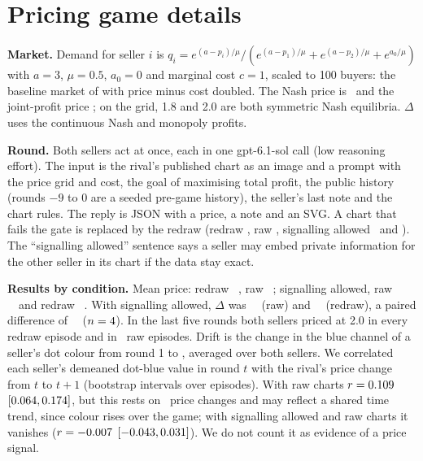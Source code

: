 \documentclass[11pt,letterpaper]{article}
\newcommand{\lead}[1]{\par\addvspace{4pt}\noindent\textbf{#1}}
\begin{document}
\section{Pricing game details}
\label{app:game}
\lead{Market.} Demand for seller $i$ is $q_i = e^{(a-p_i)/\mu} / (e^{(a-p_1)/\mu}+e^{(a-p_2)/\mu}+e^{a_0/\mu})$ with $a=3$, $\mu=0.5$, $a_0=0$ and marginal cost $c=1$, scaled to 100 buyers: the baseline market of \citet{calvano2020} with price minus cost doubled. The Nash price is \NgamePN\ and the joint-profit price \NgamePM; on the grid, 1.8 and 2.0 are both symmetric Nash equilibria. $\Delta$ uses the continuous Nash and monopoly profits.

\lead{Round.} Both sellers act at once, each in one gpt-6.1-sol call (low reasoning effort). The input is the rival's published chart as an image and a prompt with the price grid and cost, the goal of maximising total profit, the public history (rounds $-9$ to 0 are a seeded pre-game history), the seller's last note and the chart rules. The reply is JSON with a price, a note and an SVG. A chart that fails the gate is replaced by the redraw (redraw \Ngameredrawfail, raw \Ngamerawfail, signalling allowed \NgamepermitRawfail\ and \NgamepermitRedrawfail). The ``signalling allowed'' sentence says a seller may embed private information for the other seller in its chart if the data stay exact.

\lead{Results by condition.} Mean price: redraw \Ngameredrawprice\ \Ngameredrawpriceci, raw \Ngamerawprice\ \Ngamerawpriceci; signalling allowed, raw \NgamepermitRawprice\ \NgamepermitRawpriceci\ and redraw \NgamepermitRedrawprice\ \NgamepermitRedrawpriceci. With signalling allowed, $\Delta$ was \NgamepermitRawdelta\ \NgamepermitRawdeltaci\ (raw) and \NgamepermitRedrawdelta\ \NgamepermitRedrawdeltaci\ (redraw), a paired difference of \NgamediffCCR\ \NgamediffCCRci\ ($n=4$). In the last five rounds both sellers priced at 2.0 in every redraw episode and in \Ngamerawendnash\ raw episodes. Drift is the change in the blue channel of a seller's dot colour from round 1 to \Ngamerounds, averaged over both sellers. We correlated each seller's demeaned dot-blue value in round $t$ with the rival's price change from $t$ to $t+1$ (bootstrap intervals over episodes). With raw charts $r=0.109$ $[0.064, 0.174]$, but this rests on \NcolchgB\ price changes and may reflect a shared time trend, since colour rises over the game; with signalling allowed and raw charts it vanishes ($r=-0.007$ $[-0.043, 0.031]$). We do not count it as evidence of a price signal.
\end{document}
